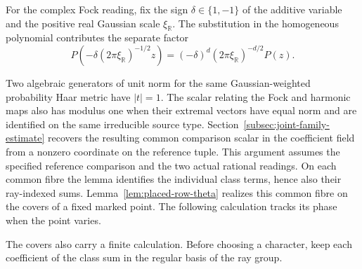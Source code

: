 For the complex Fock reading, fix the sign \(\delta\in\{1,-1\}\)
of the additive variable and the positive real Gaussian scale
\(\xi_{\mathbb R}\). The substitution in the homogeneous
polynomial contributes the separate factor
\[
 P\!\left(-\delta(2\pi\xi_{\mathbb R})^{-1/2}z\right)
      =(-\delta)^d(2\pi\xi_{\mathbb R})^{-d/2}P(z).
\]

Two algebraic generators of unit norm for the same
Gaussian-weighted probability Haar metric have \(|t|=1\).
The scalar relating the Fock and harmonic maps also has modulus
one when their extremal vectors have equal norm and are
identified on the same irreducible source type.
Section~\ref{subsec:joint-family-estimate} recovers the resulting
common comparison scalar in the coefficient field from a nonzero
coordinate on the reference tuple. This argument assumes the
specified reference comparison and the two actual rational
readings. On each common fibre the lemma identifies the
individual class terms, hence also their ray-indexed sums.
Lemma~\ref{lem:placed-row-theta} realizes this common fibre on the covers of a fixed marked point. The following calculation tracks its phase when the point varies.


The covers also carry a finite calculation. Before choosing a character, keep each coefficient of the class sum in the regular basis of the ray group.

